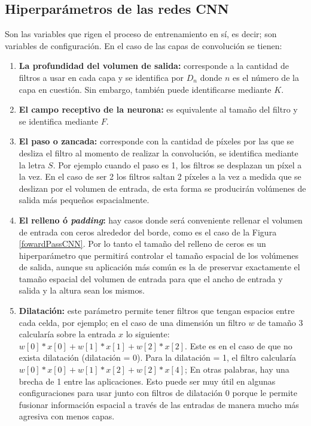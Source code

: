 \subsection{Hiperparámetros de las redes CNN}
Son las variables que rigen el proceso de entrenamiento en sí, es decir; son variables de configuración. En el caso de las capas de convolución se tienen:
\begin{enumerate}
    \item \textbf{La profundidad del volumen de salida:} corresponde a la cantidad de filtros a usar en cada capa y se identifica por $D_{n}$ donde $n$ es el número de la capa en cuestión. Sin embargo, también puede identificarse mediante $K$.
    \item \textbf{El campo receptivo de la neurona:} es equivalente al tamaño del filtro y se identifica mediante $F$.
    \item \textbf{El paso o zancada:} corresponde con la cantidad de píxeles por las que se desliza el filtro al momento de realizar la convolución, se identifica mediante la letra $S$. Por ejemplo cuando el paso es 1, los filtros se desplazan un píxel a la vez. En el caso de ser 2 los filtros saltan 2 píxeles a la vez a medida que se deslizan por el volumen de entrada, de esta forma se producirán volúmenes de salida más pequeños espacialmente.
    \item \textbf{El relleno ó \textit{padding}:} hay casos donde será conveniente rellenar el volumen de entrada con ceros alrededor del borde, como es el caso de la Figura \ref{fowardPassCNN}. Por lo tanto el tamaño del relleno de ceros es un hiperparámetro que  permitirá controlar el tamaño espacial de los volúmenes de salida, aunque su aplicación más común es la de preservar exactamente el tamaño espacial del volumen de entrada para que el ancho de entrada y salida y la altura sean los mismos.
    \item \textbf{ Dilatación:} este parámetro permite tener filtros que tengan espacios entre cada celda, por ejemplo; en el caso de una dimensión un filtro $w$ de tamaño 3 calcularía sobre la entrada $x$ lo siguiente: $w [0] * x [0] + w [1] * x [1] + w [2] * x [2]$. Este es en el caso de que no exista dilatación (dilatación = 0). Para la dilatación = 1, el filtro calcularía $w [0] * x [0] + w [1] * x [2] + w [2] * x [4]$; En otras palabras, hay una brecha de 1 entre las aplicaciones.  Esto puede ser muy útil en algunas configuraciones para usar junto con filtros de dilatación 0 porque le permite fusionar información espacial a través de las entradas de manera mucho más agresiva con menos capas.
\end{enumerate}
